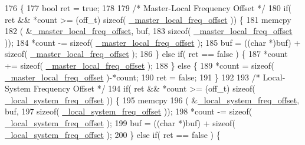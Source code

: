\begin{DoxyCode}
176                                                                     \{
177     \textcolor{keywordtype}{bool} ret = \textcolor{keyword}{true};
178 
179     \textcolor{comment}{/* Master-Local Frequency Offset */}
180     \textcolor{keywordflow}{if}( ret && *count >= (off\_t) \textcolor{keyword}{sizeof}( \hyperlink{class_i_e_e_e1588_clock_acaa18d3a0781792994fc1f34c8f43773}{\_master\_local\_freq\_offset} )) \{
181         memcpy
182             ( &\hyperlink{class_i_e_e_e1588_clock_acaa18d3a0781792994fc1f34c8f43773}{\_master\_local\_freq\_offset}, buf,
183               \textcolor{keyword}{sizeof}( \hyperlink{class_i_e_e_e1588_clock_acaa18d3a0781792994fc1f34c8f43773}{\_master\_local\_freq\_offset} ));
184         *count -= \textcolor{keyword}{sizeof}( \hyperlink{class_i_e_e_e1588_clock_acaa18d3a0781792994fc1f34c8f43773}{\_master\_local\_freq\_offset} );
185         buf = ((\textcolor{keywordtype}{char} *)buf) + \textcolor{keyword}{sizeof}( \hyperlink{class_i_e_e_e1588_clock_acaa18d3a0781792994fc1f34c8f43773}{\_master\_local\_freq\_offset} );
186     \} \textcolor{keywordflow}{else} \textcolor{keywordflow}{if}( ret == \textcolor{keyword}{false} ) \{
187         *count += \textcolor{keyword}{sizeof}( \hyperlink{class_i_e_e_e1588_clock_acaa18d3a0781792994fc1f34c8f43773}{\_master\_local\_freq\_offset} );
188     \} \textcolor{keywordflow}{else} \{
189         *count = \textcolor{keyword}{sizeof}( \hyperlink{class_i_e_e_e1588_clock_acaa18d3a0781792994fc1f34c8f43773}{\_master\_local\_freq\_offset} )-*count;
190         ret = \textcolor{keyword}{false};
191     \}
192 
193     \textcolor{comment}{/* Local-System Frequency Offset */}
194     \textcolor{keywordflow}{if}( ret && *count >= (off\_t) \textcolor{keyword}{sizeof}( \hyperlink{class_i_e_e_e1588_clock_ad28017a023b91ce56dba976677a7ce1a}{\_local\_system\_freq\_offset} )) \{
195         memcpy
196             ( &\hyperlink{class_i_e_e_e1588_clock_ad28017a023b91ce56dba976677a7ce1a}{\_local\_system\_freq\_offset}, buf,
197               \textcolor{keyword}{sizeof}( \hyperlink{class_i_e_e_e1588_clock_ad28017a023b91ce56dba976677a7ce1a}{\_local\_system\_freq\_offset} ));
198         *count -= \textcolor{keyword}{sizeof}( \hyperlink{class_i_e_e_e1588_clock_ad28017a023b91ce56dba976677a7ce1a}{\_local\_system\_freq\_offset} );
199         buf = ((\textcolor{keywordtype}{char} *)buf) + \textcolor{keyword}{sizeof}( \hyperlink{class_i_e_e_e1588_clock_ad28017a023b91ce56dba976677a7ce1a}{\_local\_system\_freq\_offset} );
200     \} \textcolor{keywordflow}{else} \textcolor{keywordflow}{if}( ret == \textcolor{keyword}{false} ) \{

\end{DoxyCode}
